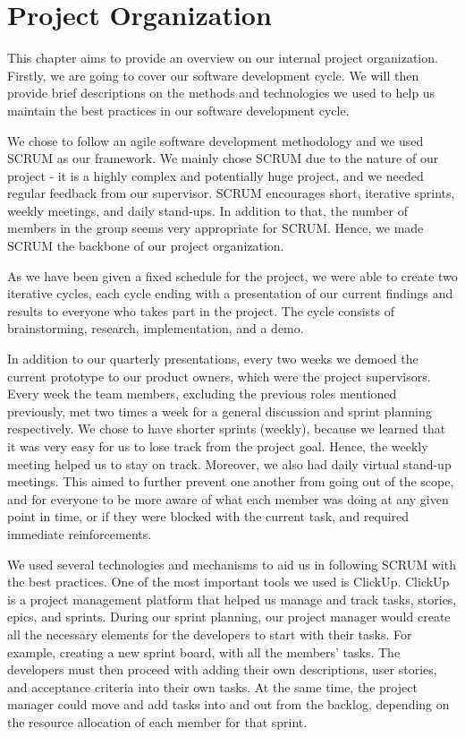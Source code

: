 \section{Project Organization}

This chapter aims to provide an overview on our internal project organization. Firstly, we are going to cover our software development cycle. We will then provide brief descriptions on the methods and technologies we used to help us maintain the best practices in our software development cycle.

We chose to follow an agile software development methodology and we used SCRUM as our framework. We mainly chose SCRUM due to the nature of our project - it is a highly complex and potentially huge project, and we needed regular feedback from our supervisor. SCRUM encourages short, iterative sprints, weekly meetings, and daily stand-ups. In addition to that, the number of members in the group seems very appropriate for SCRUM. Hence, we made SCRUM the backbone of our project organization.

As we have been given a fixed schedule for the project, we were able to create two iterative cycles, each cycle ending with a presentation of our current findings and results to everyone who takes part in the project. The cycle consists of brainstorming, research, implementation, and a demo.

In addition to our quarterly presentations, every two weeks we demoed the current prototype to our product owners, which were the project supervisors. Every week the team members, excluding the previous roles mentioned previously, met two times a week for a general discussion and sprint planning respectively. We chose to have shorter sprints (weekly), because we learned that it was very easy for us to lose track from the project goal. Hence, the weekly meeting helped us to stay on track. Moreover, we also had daily virtual stand-up meetings. This aimed to further prevent one another from going out of the scope, and for everyone to be more aware of what each member was doing at any given point in time, or if they were blocked with the current task, and required immediate reinforcements.

We used several technologies and mechanisms to aid us in following SCRUM with the best practices. One of the most important tools we used is ClickUp. ClickUp is a project management platform that helped us manage and track tasks, stories, epics, and sprints. During our sprint planning, our project manager would create all the necessary elements for the developers to start with their tasks. For example, creating a new sprint board, with all the members' tasks. The developers must then proceed with adding their own descriptions, user stories, and acceptance criteria into their own tasks. At the same time, the project manager could move and add tasks into and out from the backlog, depending on the resource allocation of each member for that sprint.

